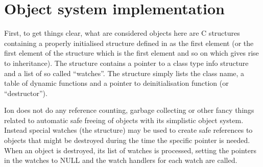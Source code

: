 \section{Object system implementation}

First, to get things clear, what are considered objects here are C
structures containing a properly initialised \type{}
structure defined in  as the first element (or the
first element of the structure which is the first element and so on which
gives rise to inheritance). The  structure contains a pointer
to a  class type info structure and
a list of so called ``watches''. The  structure simply
lists the class name, a table of dynamic functions and a pointer to
deinitialisation function (or ``destructor'').

Ion does not do any reference counting, garbage collecting or other
fancy things related to automatic safe freeing of objects with its
simplistic object system. Instead special watches (the 
 structure) may be used to create safe references to
objects that might be destroyed during the time the specific pointer is
needed. When an object is destroyed, its list of watches is processed,
setting the pointers in the watches to NULL and the watch handlers for
each watch are called. 
